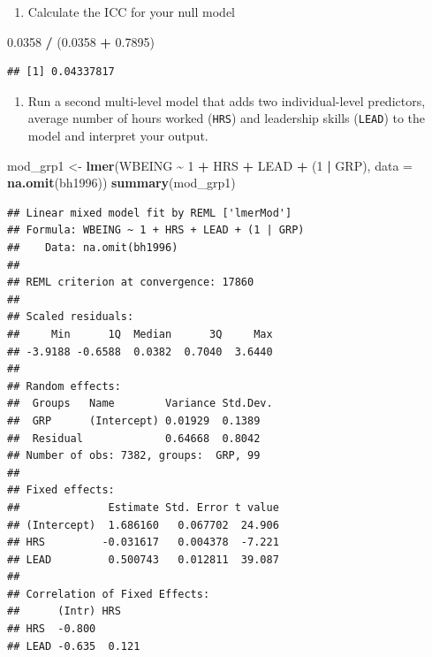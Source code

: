 \documentclass[
]{book}
\newenvironment{Shaded}{\begin{snugshade}}{\end{snugshade}}
\newcommand{\DataTypeTok}[1]{\textcolor[rgb]{0.13,0.29,0.53}{#1}}
\newcommand{\DecValTok}[1]{\textcolor[rgb]{0.00,0.00,0.81}{#1}}
\newcommand{\FloatTok}[1]{\textcolor[rgb]{0.00,0.00,0.81}{#1}}
\newcommand{\KeywordTok}[1]{\textcolor[rgb]{0.13,0.29,0.53}{\textbf{#1}}}
\newcommand{\NormalTok}[1]{#1}
\newcommand{\OperatorTok}[1]{\textcolor[rgb]{0.81,0.36,0.00}{\textbf{#1}}}
\newcommand{\StringTok}[1]{\textcolor[rgb]{0.31,0.60,0.02}{#1}}
\providecommand{\tightlist}{%
  \setlength{\itemsep}{0pt}\setlength{\parskip}{0pt}}
\begin{document}
\begin{enumerate}
\def\labelenumi{\arabic{enumi}.}
\setcounter{enumi}{1}
\tightlist
\item
  Calculate the ICC for your null model
\end{enumerate}

\begin{Shaded}
\begin{Highlighting}[]
  \FloatTok{0.0358} \OperatorTok{/}\StringTok{ }\NormalTok{(}\FloatTok{0.0358} \OperatorTok{+}\StringTok{ }\FloatTok{0.7895}\NormalTok{)}
\end{Highlighting}
\end{Shaded}

\begin{verbatim}
## [1] 0.04337817
\end{verbatim}

\begin{enumerate}
\def\labelenumi{\arabic{enumi}.}
\setcounter{enumi}{2}
\tightlist
\item
  Run a second multi-level model that adds two individual-level predictors, average number of hours worked (\texttt{HRS}) and leadership skills (\texttt{LEAD}) to the model and interpret your output.
\end{enumerate}

\begin{Shaded}
\begin{Highlighting}[]
\NormalTok{  mod\_grp1 \textless{}{-}}\StringTok{ }\KeywordTok{lmer}\NormalTok{(WBEING }\OperatorTok{\textasciitilde{}}\StringTok{ }\DecValTok{1} \OperatorTok{+}\StringTok{ }\NormalTok{HRS }\OperatorTok{+}\StringTok{ }\NormalTok{LEAD }\OperatorTok{+}\StringTok{ }\NormalTok{(}\DecValTok{1} \OperatorTok{|}\StringTok{ }\NormalTok{GRP), }\DataTypeTok{data =} \KeywordTok{na.omit}\NormalTok{(bh1996))}
  \KeywordTok{summary}\NormalTok{(mod\_grp1)}
\end{Highlighting}
\end{Shaded}

\begin{verbatim}
## Linear mixed model fit by REML ['lmerMod']
## Formula: WBEING ~ 1 + HRS + LEAD + (1 | GRP)
##    Data: na.omit(bh1996)
## 
## REML criterion at convergence: 17860
## 
## Scaled residuals: 
##     Min      1Q  Median      3Q     Max 
## -3.9188 -0.6588  0.0382  0.7040  3.6440 
## 
## Random effects:
##  Groups   Name        Variance Std.Dev.
##  GRP      (Intercept) 0.01929  0.1389  
##  Residual             0.64668  0.8042  
## Number of obs: 7382, groups:  GRP, 99
## 
## Fixed effects:
##              Estimate Std. Error t value
## (Intercept)  1.686160   0.067702  24.906
## HRS         -0.031617   0.004378  -7.221
## LEAD         0.500743   0.012811  39.087
## 
## Correlation of Fixed Effects:
##      (Intr) HRS   
## HRS  -0.800       
## LEAD -0.635  0.121
\end{verbatim}
\end{document}
